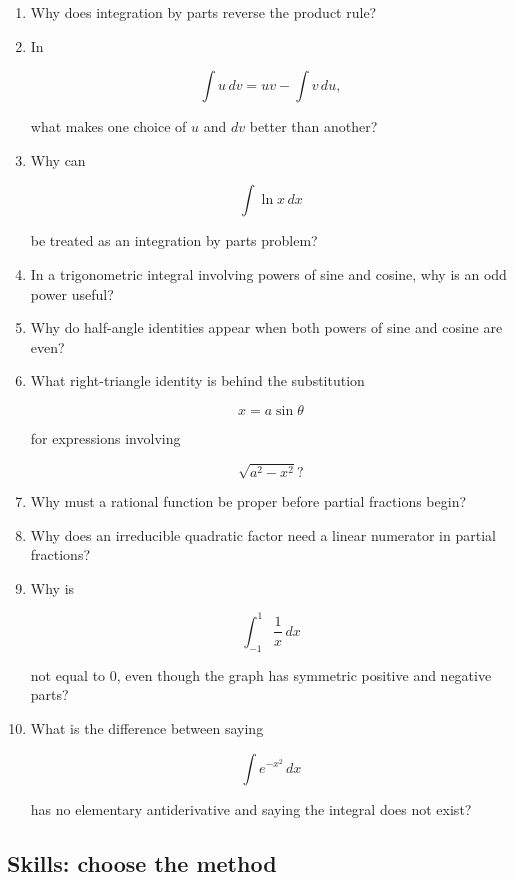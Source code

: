 \begin{enumerate}
\item Why does integration by parts reverse the product rule?

\item In

\[
\int u\,dv=uv-\int v\,du,
\]

what makes one choice of \(u\) and \(dv\) better than another?

\item Why can

\[
\int \ln x\,dx
\]

be treated as an integration by parts problem?

\item In a trigonometric integral involving powers of sine and cosine, why is an odd
power useful?

\item Why do half-angle identities appear when both powers of sine and cosine are even?

\item What right-triangle identity is behind the substitution

\[
x=a\sin\theta
\]

for expressions involving

\[
\sqrt{a^2-x^2}?
\]

\item Why must a rational function be proper before partial fractions begin?

\item Why does an irreducible quadratic factor need a linear numerator in partial
fractions?

\item Why is

\[
\int_{-1}^{1}\frac1x\,dx
\]

not equal to \(0\), even though the graph has symmetric positive and negative parts?

\item What is the difference between saying

\[
\int e^{-x^2}\,dx
\]

has no elementary antiderivative and saying the integral does not exist?
\end{enumerate}

\subsection{Skills: choose the method}
\label{subsec:skills-choose-method}


